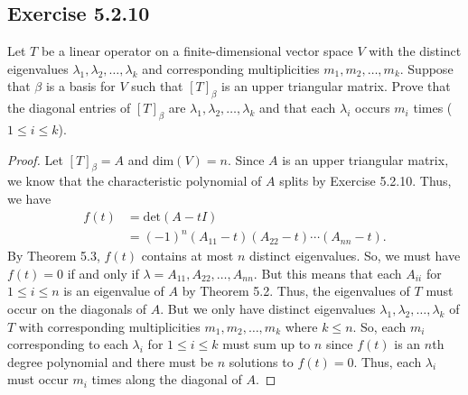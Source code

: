 \subsection*{Exercise 5.2.10} Let \( T  \) be a linear operator on a finite-dimensional vector space \( V  \) with the distinct eigenvalues \( {\lambda}_{1}, {\lambda}_{2}, \dots, {\lambda}_{k} \) and corresponding multiplicities \( {m}_{1}, {m}_{2}, \dots, {m}_{k}  \). Suppose that \( \beta \) is a basis for \( V  \) such that \( [T]_{\beta} \) is an upper triangular matrix. Prove that the diagonal entries of \( [T]_{\beta} \) are \( {\lambda}_{1}, {\lambda}_{2}, \dots, {\lambda}_{k} \) and that each \( {\lambda}_{i} \) occurs \( {m}_{i} \) times (\( 1 \leq i \leq k  \)).
\begin{proof}
Let \( [T]_{\beta} = A  \) and \(  \text{dim}(V) = n \). Since \( A  \) is an upper triangular matrix, we know that the characteristic polynomial of \( A  \) splits by Exercise 5.2.10. Thus, we have
\begin{align*}
    f(t) &= \text{det}(A - tI) \\
         &= (-1)^{n} ({A}_{11} - t)({A}_{22} - t) \cdots ({A}_{nn} -t).
\end{align*}
By Theorem 5.3, \( f(t) \) contains at most \( n   \) distinct eigenvalues. So, we must have \( f(t) = 0  \) if and only if \( \lambda = {A}_{11}, {A}_{22}, \dots, {A}_{nn} \). But this means that each \( {A}_{ii} \) for \( 1 \leq i \leq n  \) is an eigenvalue of \( A  \) by Theorem 5.2. Thus, the eigenvalues of \(T\) must occur on the diagonals of \( A  \). But we only have distinct eigenvalues \( {\lambda}_{1}, {\lambda}_{2}, \dots, {\lambda}_{k }  \) of \( T  \) with corresponding multiplicities \( {m}_{1}, {m}_{2}, \dots, {m}_{k } \) where \( k \leq n  \). So, each \( {m}_{i} \) corresponding to each \( {\lambda}_{i} \) for \( 1 \leq i \leq k  \) must sum up to \( n  \) since \( f(t) \) is an \( n \)th degree polynomial and there must be \( n  \) solutions to \( f(t) = 0  \). Thus, each \( {\lambda}_{i} \) must occur \( {m}_{i} \) times along the diagonal of \( A  \). 
\end{proof}


